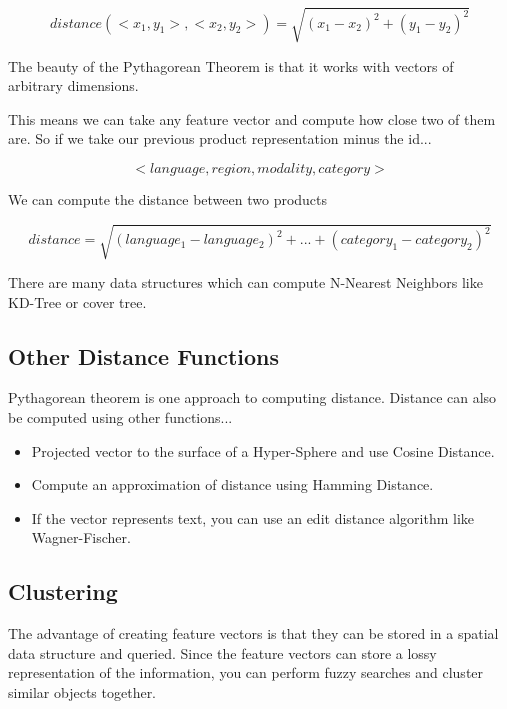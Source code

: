 \documentclass[11pt]{article}
\begin{document}
\begin{equation}
    distance(<x_1, y_1>, <x_2, y_2>) = \sqrt{(x_1-x_2)^2 + (y_1-y_2)^2}
\end{equation}

The beauty of the Pythagorean Theorem is that it works with vectors of arbitrary
dimensions.

This means we can take any feature vector and compute how close two of them are.
So if we take our previous product representation minus the id...

\begin{equation}
    < language, region, modality, category> 
\end{equation}

We can compute the distance between two products 

\begin{equation}
    distance = \sqrt{(language_1-language_2)^2 + ... + (category_1 - category_2)^2}
\end{equation}

There are many data structures which can compute N-Nearest Neighbors like KD-Tree
or cover tree. 

\subsection{Other Distance Functions}

Pythagorean theorem is one approach to computing distance. 
Distance can also be computed using other functions...

\begin{itemize}
    \item Projected vector to the surface of a Hyper-Sphere and use Cosine Distance.
    \item Compute an approximation of distance using Hamming Distance. 
    \item If the vector represents text, you can use an edit distance algorithm like
          Wagner-Fischer.
\end{itemize}

\subsection{Clustering}
The advantage of creating feature vectors is that they can be stored in a spatial
data structure and queried. Since the feature vectors can store a lossy representation
of the information, you can perform fuzzy searches and cluster similar objects together.
\end{document}
